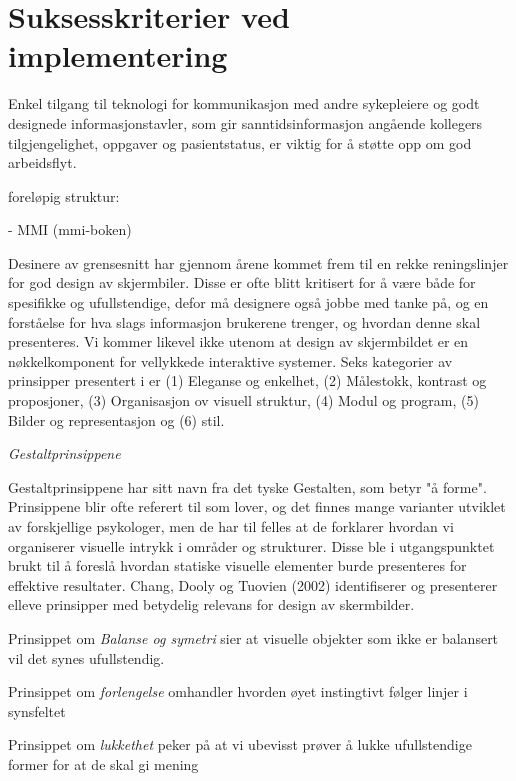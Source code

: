 \section{Suksesskriterier ved implementering}
\label{chp: suksesskriterier}


\noindent
Enkel tilgang til teknologi for kommunikasjon med andre sykepleiere og godt designede informasjonstavler, som gir sanntidsinformasjon angående kollegers tilgjengelighet, oppgaver og pasientstatus, er viktig for å støtte opp om god arbeidsflyt\cite{Ebright10}.


foreløpig struktur:


- MMI (mmi-boken)

Desinere av grensesnitt har gjennom årene kommet frem til en rekke reningslinjer for god design av skjermbiler. Disse er ofte blitt kritisert for å være både for spesifikke og ufullstendige\cite{mmi}, defor må designere også jobbe med tanke på, og en forståelse for hva slags informasjon brukerene trenger, og hvordan denne skal presenteres\cite{Ebright10}. Vi kommer likevel ikke utenom at design av skjermbildet er en nøkkelkomponent for vellykkede interaktive systemer\cite{mmi}. Seks kategorier av prinsipper presentert i \cite{mmi} er (1) Eleganse og enkelhet,  (2) Målestokk, kontrast og proposjoner, (3) Organisasjon ov visuell struktur, (4) Modul og program, (5) Bilder og representasjon og (6) stil.

\noindent
\emph{Gestaltprinsippene}

\noindent
Gestaltprinsippene har sitt navn fra det tyske Gestalten, som betyr "å forme". Prinsippene blir ofte referert til som lover, og det finnes mange varianter utviklet av forskjellige psykologer, men de har til felles at de forklarer hvordan vi organiserer visuelle intrykk i områder og strukturer. Disse ble i utgangspunktet brukt til å foreslå hvordan statiske visuelle elementer burde presenteres for effektive resultater\cite{Chang02}. Chang, Dooly og Tuovien (2002) identifiserer og presenterer elleve prinsipper med betydelig relevans for design av skermbilder. 

\noindent
Prinsippet om \emph{Balanse og symetri} sier at visuelle objekter som ikke er balansert vil det synes ufullstendig.

\noindent
Prinsippet om \emph{forlengelse} omhandler hvorden øyet instingtivt følger linjer i synsfeltet

\noindent
Prinsippet om \emph{lukkethet} peker på at vi ubevisst prøver å lukke ufullstendige former for at de skal gi mening

